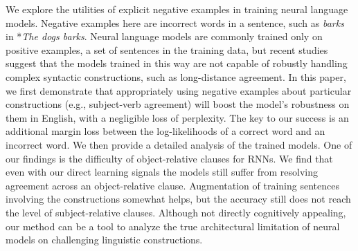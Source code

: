 We explore the utilities of explicit negative examples in training neural language models. Negative examples here are incorrect words in a sentence, such as {\it barks} in *{\it The dogs barks}. Neural language models are commonly trained only on positive examples, a set of sentences in the training data, but recent studies suggest that the models trained in this way are not capable of robustly handling complex syntactic constructions, such as long-distance agreement. In this paper, we first demonstrate that appropriately using negative examples about particular constructions (e.g., subject-verb agreement) will boost the model's robustness on them in English, with a negligible loss of perplexity. The key to our success is an additional margin loss between the log-likelihoods of a correct word and an incorrect word. We then provide a detailed analysis of the trained models. One of our findings is the difficulty of object-relative clauses for RNNs. We find that even with our direct learning signals the models still suffer from resolving agreement across an object-relative clause. Augmentation of training sentences involving the constructions somewhat helps, but the accuracy still does not reach the level of subject-relative clauses. Although not directly cognitively appealing, our method can be a tool to analyze the true architectural limitation of neural models on challenging linguistic constructions.
